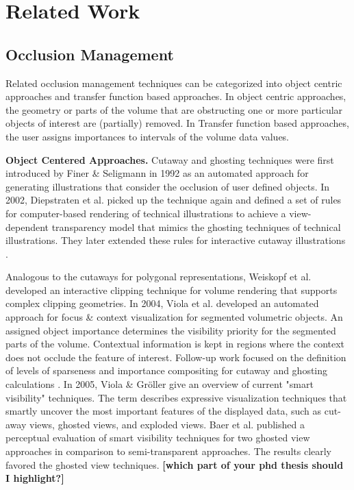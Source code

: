 \section{Related Work}


\subsection{Occlusion Management}
Related occlusion management techniques can be categorized into object centric approaches and transfer function based approaches. In object centric approaches, the geometry or parts of the volume that are obstructing one or more particular objects of interest are (partially) removed. In Transfer function based approaches, the user assigns importances to intervals of the volume data values.

\noindent
\textbf{Object Centered Approaches.}
Cutaway and ghosting techniques were first introduced by Finer \& Seligmann \cite{feiner92} in 1992 as an automated approach for generating illustrations that consider the occlusion of user defined objects. In 2002, Diepstraten et al. \cite{diep02} picked up the technique again and defined a set of rules for computer-based rendering of technical illustrations to achieve a view-dependent transparency model that mimics the ghosting techniques of technical illustrations. They later extended these rules for interactive cutaway illustrations \cite{diep03}.

Analogous to the cutaways for polygonal representations, Weiskopf et al. \cite{weiskopf03} developed an interactive clipping technique for volume rendering that supports complex clipping geometries. In 2004, Viola et al. \cite{viola2004importance} developed an automated approach for focus \& context visualization for segmented volumetric objects. An assigned object importance determines the visibility priority for the segmented parts of the volume. Contextual information is kept in regions where the context does not occlude the feature of interest. Follow-up work focused on the definition of levels of sparseness and importance compositing for cutaway and ghosting calculations \cite{Viola05}. 
In 2005, Viola \& Gr{\"o}ller \cite{violasmart05} give an overview of current "smart visibility" techniques. The term describes expressive visualization techniques that smartly uncover the most important features of the displayed data, such as cut-away views, ghosted views, and exploded views. Baer et al. \cite{baer11} published a perceptual evaluation of smart visibility techniques for two ghosted view approaches in comparison to semi-transparent approaches. The results clearly favored the ghosted view techniques.
\textbf{[which part of your phd thesis should I highlight?]}

